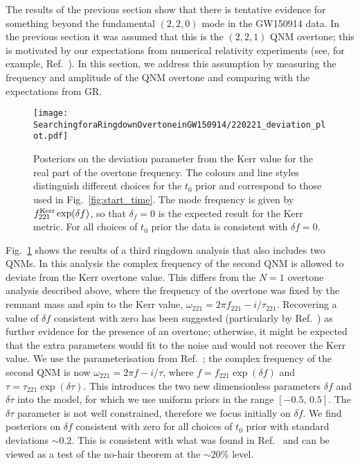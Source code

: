 The results of the previous section show that there is tentative evidence for something beyond the fundamental $(2,2,0)$ mode in the GW150914 data. 
In the previous section it was assumed that this is the $(2,2,1)$ QNM overtone; this is motivated by our expectations from numerical relativity experiments (see, for example, Ref.~\cite{Giesler:2019uxc}). 
In this section, we address this assumption by measuring the frequency and amplitude of the QNM overtone and comparing with the expectations from GR.

\begin{figure}[t]
    \centering
    \texttt{[image: SearchingforaRingdownOvertoneinGW150914/220221\_deviation\_plot.pdf]}
    \caption[Posteriors on the deviation from the Kerr for the real part of the GW150914 overtone frequency]{ 
    Posteriors on the deviation parameter from the Kerr value for the real part of the overtone frequency.
    The colours and line styles distinguish different choices for the $t_0$ prior and correspond to those used in Fig.~\ref{fig:start_time}.
    The mode frequency is given by $f_{221}^{\rm Kerr} \exp(\delta f)$, so that $\delta_f=0$ is the expected result for the Kerr metric.
    For all choices of $t_0$ prior the data is consistent with $\delta f=0$.
    }
    \label{fig:delta_f}
\end{figure}

Fig.~\ref{fig:delta_f} shows the results of a third ringdown analysis that also includes two QNMs.
In this analysis the complex frequency of the second QNM is allowed to deviate from the Kerr overtone value. 
This differs from the $N=1$ overtone analysis described above, where the frequency of the overtone was fixed by the remnant mass and spin to the Kerr value, $\omega_{221} = 2\pi f_{221} - i/\tau_{221}$.
Recovering a value of $\delta f$ consistent with zero has been suggested (particularly by Ref.~\cite{Isi:2022mhy}) as further evidence for the presence of an overtone; otherwise, it might be expected that the extra parameters would fit to the noise and would not recover the Kerr value.
We use the parameterisation from Ref.~\cite{Isi:2022mhy}; the complex frequency of the second QNM is now $\omega_{221} = 2\pi f-i/\tau$, where $f=f_{221}\exp(\delta f)$ and $\tau=\tau_{221}\exp(\delta \tau)$. 
This introduces the two new dimensionless parameters $\delta f$ and $\delta \tau$ into the model, for which we use uniform priors in the range $[-0.5,\, 0.5]$.
The $\delta \tau$ parameter is not well constrained, therefore we focus initially on $\delta f$.
We find posteriors on $\delta f$ consistent with zero for all choices of $t_0$ prior with standard deviations $\sim 0.2$. 
This is consistent with what was found in Ref.~\cite{Isi:2019aib} and can be viewed as a test of the no-hair theorem at the $\sim 20\%$ level.

